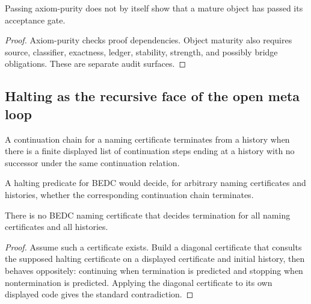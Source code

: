 
\begin{corollary}
\label{cor:philosophy-purity-not-full-maturity}
Passing axiom-purity does not by itself show that a mature object has
passed its acceptance gate.
\end{corollary}
\begin{proof}
Axiom-purity checks proof dependencies. Object maturity also requires
source, classifier, exactness, ledger, stability, strength, and
possibly bridge obligations. These are separate audit surfaces.
\end{proof}

\subsection{Halting as the recursive face of the open meta loop}
\label{subsec:philosophy-halting-open-meta-loop}

\begin{definition}
\label{def:philosophy-cont-chain-termination}
A continuation chain for a naming certificate terminates from a history
when there is a finite displayed list of continuation steps ending at a
history with no successor under the same continuation relation.
\end{definition}

\begin{definition}
\label{def:philosophy-halting-predicate}
A halting predicate for BEDC would decide, for arbitrary naming
certificates and histories, whether the corresponding continuation
chain terminates.
\end{definition}

\begin{theorem}
\label{thm:philosophy-no-total-halting-certificate}
There is no BEDC naming certificate that decides termination for all
naming certificates and all histories.
\end{theorem}
\begin{proof}
Assume such a certificate exists. Build a diagonal certificate that
consults the supposed halting certificate on a displayed certificate
and initial history, then behaves oppositely: continuing when
termination is predicted and stopping when nontermination is predicted.
Applying the diagonal certificate to its own displayed code gives the
standard contradiction.
\end{proof}

